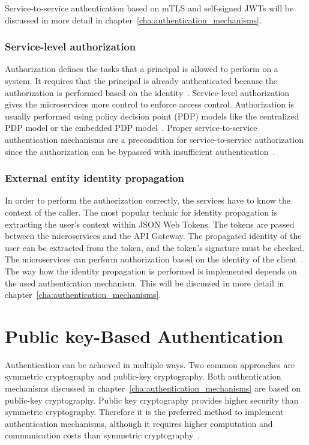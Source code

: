 Service-to-service authentication based on mTLS and self-signed JWTs will be discussed in more detail in chapter~\ref{cha:authentication_mechanisms}.

\subsubsection{Service-level authorization} 
\label{sec:service-level-authorization}
Authorization defines the tasks that a principal is allowed to perform on a system.
It requires that the principal is already authenticated because the authorization is performed based on the identity~\cite{siriwardena2014advanced}. 
Service-level authorization gives the microservices more control to enforce access control.
Authorization is usually performed using policy decision point (PDP) models like the centralized PDP model or the embedded PDP model~\cite{dias2020microservices, barabanov2020authentication}.
Proper service-to-service authentication mechanisms are a precondition for service-to-service authorization since the authorization can be bypassed with insufficient authentication~\cite{siriwardena2014advanced}.

\subsubsection{External entity identity propagation} 
\label{sec:external-entity-identity-propagation}
In order to perform the authorization correctly, the services have to know the context of the caller.
The most popular technic for identity propagation is extracting the user's context within JSON Web Tokens.
The tokens are passed between the microservices and the API Gateway.
The propagated identity of the user can be extracted from the token, and the token's signature must be checked.
The microservices can perform authorization based on the identity of the client~\cite{barabanov2020authentication, dias2020microservices}.
The way how the identity propagation is performed is implemented depends on the used authentication mechanism.
This will be discussed in more detail in chapter~\ref{cha:authentication_mechanisms}.

\section{Public key-Based Authentication}
Authentication can be achieved in multiple ways.
Two common approaches are symmetric cryptography and public-key cryptography.
Both authentication mechanisms discussed in chapter~\ref{cha:authentication_mechanisms} are based on public-key cryptography.
Public key cryptography provides higher security than symmetric cryptography.
Therefore it is the preferred method to implement authentication mechanisms, although it requires higher computation and communication costs than symmetric cryptography~\cite{pubkeycrypto}.

